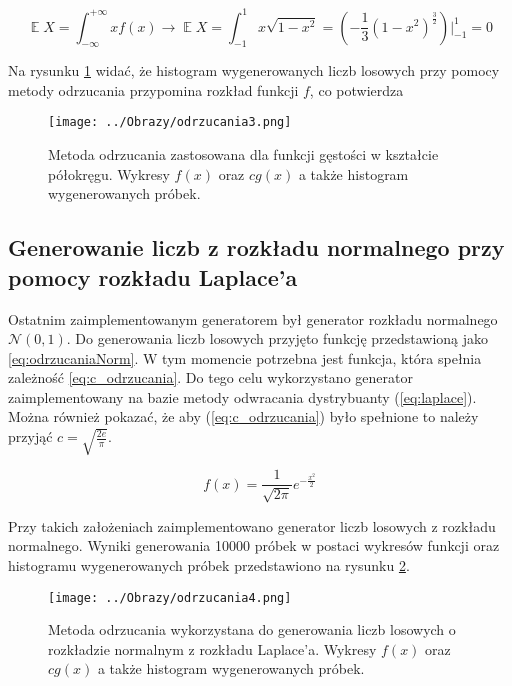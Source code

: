 \documentclass[12pt,a4paper]{article}
\DeclareMathOperator*{\E}{\mathbb{E}}
\begin{document}
\begin{equation}\label{eq:wartoscoczekiwana}
\E X = \int_{-\infty}^{+\infty}xf(x) \rightarrow \E X = \int_{-1}^{1}x\sqrt{1-x^{2}} = (-\frac{1}{3}(1-x^{2})^{\frac{3}{2}})|_{-1}^{1} = 0
\end{equation}


Na rysunku \ref{fig:odrzucania3} widać, że histogram wygenerowanych liczb losowych przy pomocy metody odrzucania przypomina rozkład funkcji $f$, co potwierdza 

\begin{figure}[H]
\centering
\texttt{[image: ../Obrazy/odrzucania3.png]} 
\caption{Metoda odrzucania zastosowana dla funkcji gęstości w kształcie półokręgu. Wykresy $f(x)$ oraz $cg(x)$ a także histogram wygenerowanych próbek.}
\label{fig:odrzucania3}
\end{figure}

\subsection{Generowanie liczb z rozkładu normalnego przy pomocy rozkładu Laplace'a}
Ostatnim zaimplementowanym generatorem był generator rozkładu normalnego $\mathcal{N}(0,1)$.
Do generowania liczb losowych przyjęto funkcję przedstawioną jako \ref{eq:odrzucaniaNorm}.
W tym momencie potrzebna jest funkcja, która spełnia zależność \ref{eq:c_odrzucania}.
Do tego celu wykorzystano generator zaimplementowany na bazie metody odwracania dystrybuanty (\ref{eq:laplace}).
Można również pokazać, że aby (\ref{eq:c_odrzucania}) było spełnione to należy przyjąć $c=\sqrt{\frac{2e}{\pi}}$.

\begin{equation}\label{eq:odrzucaniaNorm}
f(x)=\frac{1}{\sqrt{2\pi}}e^{-\frac{x^{2}}{2}}
\end{equation}

Przy takich założeniach zaimplementowano generator liczb losowych z rozkładu normalnego.
Wyniki generowania 10000 próbek w postaci wykresów funkcji oraz histogramu wygenerowanych próbek przedstawiono na rysunku \ref{fig:odrzucania4}.

\begin{figure}[H]
\centering
\texttt{[image: ../Obrazy/odrzucania4.png]} 
\caption{Metoda odrzucania wykorzystana do generowania liczb losowych o rozkładzie normalnym z rozkładu Laplace'a. Wykresy $f(x)$ oraz $cg(x)$ a także histogram wygenerowanych próbek.}
\label{fig:odrzucania4}
\end{figure}
\end{document}
